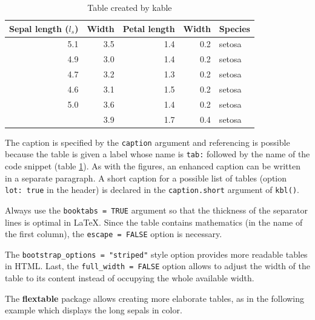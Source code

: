 \documentclass[
  12pt,
  american,
  a4paper,
  extrafontsizes,onecolumn,openright
  ]{memoir}
\begin{document}
\begin{table}
\centering
\caption{\label{tab:kable}Table created by kable}
\centering
\begin{tabular}[t]{rrrrl}
\toprule
Sepal length ($l_s$) & Width & Petal length & Width & Species\\
\midrule
5.1 & 3.5 & 1.4 & 0.2 & setosa\\
4.9 & 3.0 & 1.4 & 0.2 & setosa\\
4.7 & 3.2 & 1.3 & 0.2 & setosa\\
4.6 & 3.1 & 1.5 & 0.2 & setosa\\
5.0 & 3.6 & 1.4 & 0.2 & setosa\\
\addlinespace
5.4 & 3.9 & 1.7 & 0.4 & setosa\\
\bottomrule
\end{tabular}
\end{table}

\normalsize

The caption is specified by the \texttt{caption} argument and referencing is possible because the table is given a label whose name is \texttt{tab:} followed by the name of the code snippet (table \ref{tab:kable}).
As with the figures, an enhanced caption can be written in a separate paragraph.
A short caption for a possible list of tables (option \texttt{lot:\ true} in the header) is declared in the \texttt{caption.short} argument of \texttt{kbl()}.

Always use the \texttt{booktabs\ =\ TRUE} argument so that the thickness of the separator lines is optimal in LaTeX.
Since the table contains mathematics (in the name of the first column), the \texttt{escape\ =\ FALSE} option is necessary.

The \texttt{bootstrap\_options\ =\ "striped"} style option provides more readable tables in HTML.
Last, the \texttt{full\_width\ =\ FALSE} option allows to adjust the width of the table to its content instead of occupying the whole available width.

The \textbf{flextable} package allows creating more elaborate tables, as in the following example which displays the long sepals in color.

\scriptsize
\end{document}
